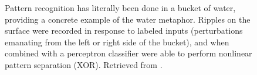 \begin{figure}[h]
\centering
{}
\caption[Fernando, Chrisantha and Sojakka, Sampsa.]{Pattern recognition has literally been done in a bucket of water, providing a concrete example of the water metaphor. Ripples on the surface were recorded in response to labeled inputs (perturbations emanating from the left or right side of the bucket), and when combined with a perceptron classifier were able to perform nonlinear pattern separation (XOR). Retrieved from \cite{fernando2003pattern}. }
\label{F:bucketclassifier}
\end{figure}

